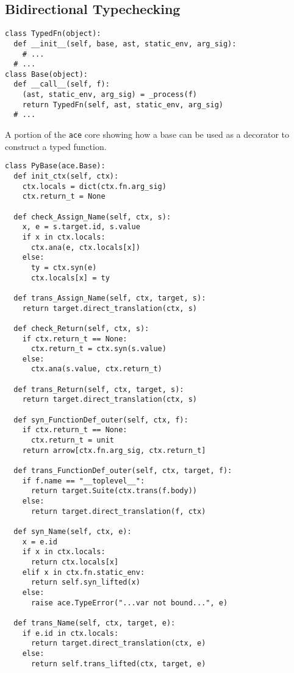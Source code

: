 {\subsection{Bidirectional Typechecking}
\begin{codelisting}
\begin{lstlisting}
class TypedFn(object):
  def __init__(self, base, ast, static_env, arg_sig):
    # ...
  # ...
class Base(object):
  def __call__(self, f):
    (ast, static_env, arg_sig) = _process(f)
    return TypedFn(self, ast, static_env, arg_sig)
  # ...
\end{lstlisting}
\caption{A portion of the \texttt{ace} core showing how a base can be used as a decorator to construct a typed function.}
\label{base}
\end{codelisting}

\begin{codelisting}
\begin{lstlisting}
class PyBase(ace.Base):
  def init_ctx(self, ctx):
    ctx.locals = dict(ctx.fn.arg_sig)
    ctx.return_t = None

  def check_Assign_Name(self, ctx, s):
    x, e = s.target.id, s.value
    if x in ctx.locals:
      ctx.ana(e, ctx.locals[x])
    else:
      ty = ctx.syn(e)
      ctx.locals[x] = ty
	  
  def trans_Assign_Name(self, ctx, target, s):
    return target.direct_translation(ctx, s)
              
  def check_Return(self, ctx, s):
    if ctx.return_t == None:
      ctx.return_t = ctx.syn(s.value)
    else:
      ctx.ana(s.value, ctx.return_t)
      
  def trans_Return(self, ctx, target, s):
    return target.direct_translation(ctx, s)
          
  def syn_FunctionDef_outer(self, ctx, f):
    if ctx.return_t == None:
      ctx.return_t = unit
    return arrow[ctx.fn.arg_sig, ctx.return_t]
    
  def trans_FunctionDef_outer(self, ctx, target, f):
    if f.name == "__toplevel__":
      return target.Suite(ctx.trans(f.body))
    else:
      return target.direct_translation(f, ctx)

  def syn_Name(self, ctx, e):
    x = e.id
    if x in ctx.locals:
      return ctx.locals[x]
    elif x in ctx.fn.static_env:
      return self.syn_lifted(x)
    else:
      raise ace.TypeError("...var not bound...", e)
      
  def trans_Name(self, ctx, target, e):
    if e.id in ctx.locals:
      return target.direct_translation(ctx, e)
    else:
      return self.trans_lifted(ctx, target, e)
  

\end{lstlisting}
\end{codelisting}}
